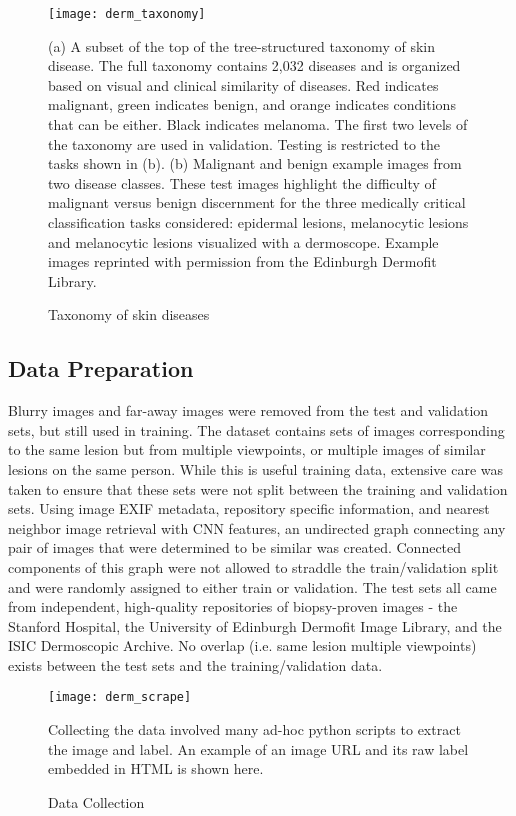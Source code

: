 \begin{figure}
\texttt{[image: derm\_taxonomy]}
\caption{Taxonomy of skin diseases}
\vspace{12px}
(a) A subset of the top of the tree-structured taxonomy of skin disease. The full taxonomy contains 2,032 diseases and is organized based on visual and clinical similarity of diseases. Red indicates malignant, green indicates benign, and orange indicates conditions that can be either. Black indicates melanoma. The first two levels of the taxonomy are used in validation. Testing is restricted to the tasks shown in (b). (b) Malignant and benign example images from two disease classes. These test images highlight the difficulty of malignant versus benign discernment for the three medically critical classification tasks considered: epidermal lesions, melanocytic lesions and melanocytic lesions visualized with a dermoscope. Example images reprinted with permission from the Edinburgh Dermofit Library.
\label{fig:derm_taxonomy}
\end{figure}

\subsection{Data Preparation}
Blurry images and far-away images were removed from the test and validation sets, but still used in training. The dataset contains sets of images corresponding to the same lesion but from multiple viewpoints, or multiple images of similar lesions on the same person. While this is useful training data, extensive care was taken to ensure that these sets were not split between the training and validation sets. Using image EXIF metadata, repository specific information, and nearest neighbor image retrieval with CNN features, an undirected graph connecting any pair of images that were determined to be similar was created. Connected components of this graph were not allowed to straddle the train/validation split and were randomly assigned to either train or validation. The test sets all came from independent, high-quality repositories of biopsy-proven images - the Stanford Hospital, the University of Edinburgh Dermofit Image Library, and the ISIC Dermoscopic Archive. No overlap (i.e. same lesion multiple viewpoints) exists between the test sets and the training/validation data.

\begin{figure}
\texttt{[image: derm\_scrape]}
\caption{Data Collection}
\vspace{12px}
Collecting the data involved many ad-hoc python scripts to extract the image and label.  An example of an image URL and its raw label embedded in HTML is shown here.
\label{fig:derm_scrape}
\end{figure}

